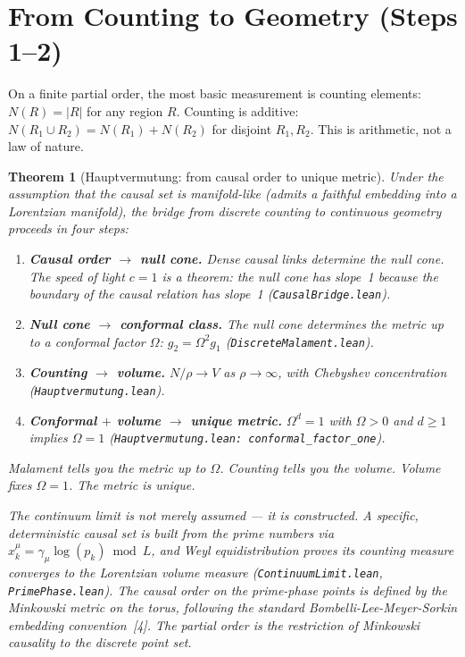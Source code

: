 \documentclass[11pt,letterpaper]{article}
\newtheorem{theorem}{Theorem}
\begin{document}
\section{From Counting to Geometry (Steps 1--2)}
\label{sec:source}

On a finite partial order, the most basic measurement is counting
elements: $N(R) = |R|$ for any region $R$.  Counting is additive:
$N(R_1 \cup R_2) = N(R_1) + N(R_2)$ for disjoint $R_1, R_2$.  This
is arithmetic, not a law of nature.

\begin{theorem}[Hauptvermutung: from causal order to unique metric]
\label{thm:hauptvermutung}
Under the assumption that the causal set is manifold-like (admits a
faithful embedding into a Lorentzian manifold), the bridge from
discrete counting to continuous geometry proceeds in four steps:
\begin{enumerate}[nosep]
  \item \textbf{Causal order $\to$ null cone.}  Dense causal links
    determine the null cone.  The speed of light $c = 1$ is a theorem:
    the null cone has slope~1 because the boundary of the causal
    relation has slope~1
    (\texttt{CausalBridge.lean}).
  \item \textbf{Null cone $\to$ conformal class.}  The null cone
    determines the metric up to a conformal factor $\Omega$:
    $g_2 = \Omega^2 g_1$
    (\texttt{DiscreteMalament.lean}).
  \item \textbf{Counting $\to$ volume.}  $N/\rho \to V$ as
    $\rho \to \infty$, with Chebyshev concentration
    (\texttt{Hauptvermutung.lean}).
  \item \textbf{Conformal $+$ volume $\to$ unique metric.}
    $\Omega^d = 1$ with $\Omega > 0$ and $d \geq 1$ implies
    $\Omega = 1$
    (\texttt{Hauptvermutung.lean: conformal\_factor\_one}).
\end{enumerate}
Malament tells you the metric up to $\Omega$.  Counting tells you
the volume.  Volume fixes $\Omega = 1$.  The metric is unique.

The continuum limit is not merely assumed --- it is constructed.
A specific, deterministic causal set is built from the prime numbers
via $x^\mu_k = \gamma_\mu \log(p_k) \bmod L$, and Weyl
equidistribution proves its counting measure converges to the
Lorentzian volume measure (\texttt{ContinuumLimit.lean},
\texttt{PrimePhase.lean}).  The causal order on the prime-phase
points is defined by the Minkowski metric on the torus, following the
standard Bombelli-Lee-Meyer-Sorkin embedding convention~[4].  The
partial order \emph{is} the restriction of Minkowski causality to
the discrete point set.


\end{theorem}
\end{document}
